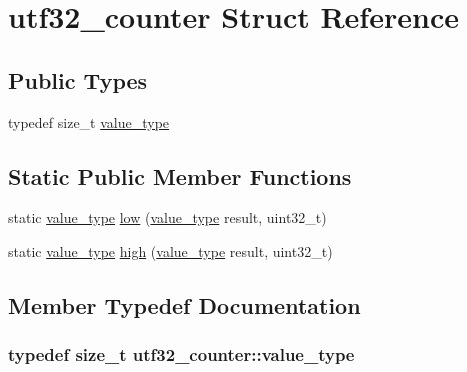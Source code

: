 \hypertarget{structutf32__counter}{
\section{utf32\_\-counter Struct Reference}
\label{structutf32__counter}
}
\subsection*{Public Types}
\begin{DoxyCompactItemize}
\item 
typedef size\_\-t \hyperlink{structutf32__counter_a6fb6728fe1a009958000f0e934fa6500}{value\_\-type}
\end{DoxyCompactItemize}
\subsection*{Static Public Member Functions}
\begin{DoxyCompactItemize}
\item 
static \hyperlink{structutf32__counter_a6fb6728fe1a009958000f0e934fa6500}{value\_\-type} \hyperlink{structutf32__counter_a3a75f4840e0391ed972ddba621d49480}{low} (\hyperlink{structutf32__counter_a6fb6728fe1a009958000f0e934fa6500}{value\_\-type} result, uint32\_\-t)
\item 
static \hyperlink{structutf32__counter_a6fb6728fe1a009958000f0e934fa6500}{value\_\-type} \hyperlink{structutf32__counter_aa72f5248b1dc5937330ab049bf449251}{high} (\hyperlink{structutf32__counter_a6fb6728fe1a009958000f0e934fa6500}{value\_\-type} result, uint32\_\-t)
\end{DoxyCompactItemize}


\subsection{Member Typedef Documentation}
\hypertarget{structutf32__counter_a6fb6728fe1a009958000f0e934fa6500}{
\subsubsection[{value\_\-type}]{\setlength{\rightskip}{0pt plus 5cm}typedef size\_\-t {\bf utf32\_\-counter::value\_\-type}}}
\label{structutf32__counter_a6fb6728fe1a009958000f0e934fa6500}


